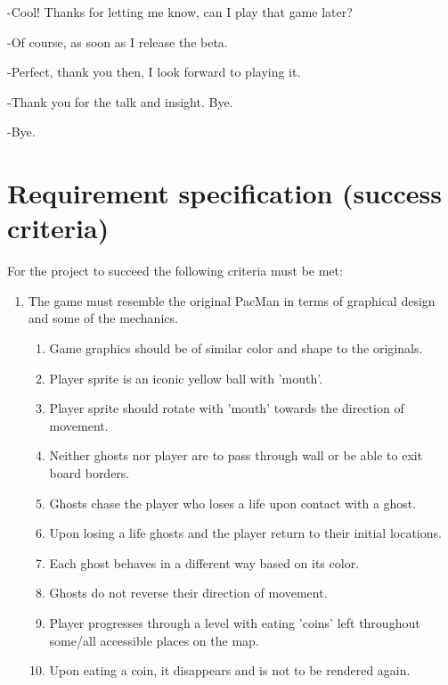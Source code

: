 \documentclass[11pt,a4paper]{report}
\begin{document}
			-Cool! Thanks for letting me know, can I play that game later?
			
			-Of course, as soon as I release the beta.
			
			-Perfect, thank you then, I look forward to playing it.
			
			-Thank you for the talk and insight. Bye.
			
			-Bye.
		\section{Requirement specification (success criteria)}
			For the project to succeed the following criteria must be met:\\
			\begin{enumerate}
				\item 
				The game must resemble the original PacMan in terms of graphical design and some of the mechanics.
				\begin{enumerate}
					\item
						Game graphics should be of similar color and shape to the originals.
						\label{req-orig-colors}
					\item
						Player sprite is an iconic yellow ball with 'mouth'.
						\label{req-player-shape}
					\item
						Player sprite should rotate with 'mouth' towards the direction of movement. 
						\label{req-player-rotation}
					\item
						Neither ghosts nor player are to pass through wall or be able to exit board borders.
						\label{req-walls-not-passable}
					\item
						Ghosts chase the player who loses a life upon contact with a ghost.
						\label{req-ghost-movement}
					\item
						Upon losing a life ghosts and the player return to their initial locations.
						\label{req-reset}
					\item
						Each ghost behaves in a different way based on its color.
						\label{req-ghost-differences}
					\item
						Ghosts do not reverse their direction of movement.
						\label{req-ghost-not-reversing}
					\item
						Player progresses through a level with eating 'coins' left throughout some/all accessible places on the map.
						\label{req-level-progress}
					\item
						Upon eating a coin, it disappears and is not to be rendered again.
						\label{req-coins-disappearing}

\end{enumerate}
\end{enumerate}
\end{document}
